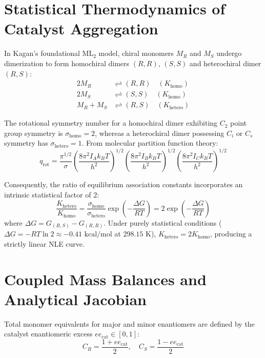 \documentclass[11pt,a4paper]{article}
\begin{document}
\section{Statistical Thermodynamics of Catalyst Aggregation}

In Kagan's foundational $\text{ML}_2$ model, chiral monomers $M_R$ and $M_S$ undergo dimerization to form homochiral dimers $(R,R)$, $(S,S)$ and heterochiral dimer $(R,S)$:
\begin{align}
2 M_R &\rightleftharpoons (R,R) \quad (K_{\text{homo}}) \\
2 M_S &\rightleftharpoons (S,S) \quad (K_{\text{homo}}) \\
M_R + M_S &\rightleftharpoons (R,S) \quad (K_{\text{hetero}})
\end{align}

The rotational symmetry number for a homochiral dimer exhibiting $C_2$ point group symmetry is $\sigma_{\text{homo}} = 2$, whereas a heterochiral dimer possessing $C_i$ or $C_s$ symmetry has $\sigma_{\text{hetero}} = 1$. From molecular partition function theory:
\begin{equation}
q_{\text{rot}} = \frac{\pi^{1/2}}{\sigma} \left( \frac{8 \pi^2 I_A k_B T}{h^2} \right)^{1/2} \left( \frac{8 \pi^2 I_B k_B T}{h^2} \right)^{1/2} \left( \frac{8 \pi^2 I_C k_B T}{h^2} \right)^{1/2}
\end{equation}

Consequently, the ratio of equilibrium association constants incorporates an intrinsic statistical factor of 2:
\begin{equation}
\frac{K_{\text{hetero}}}{K_{\text{homo}}} = \frac{\sigma_{\text{homo}}}{\sigma_{\text{hetero}}} \exp\left( -\frac{\Delta G}{RT} \right) = 2 \exp\left( -\frac{\Delta G}{RT} \right)
\end{equation}
where $\Delta G = G_{(R,S)} - G_{(R,R)}$. Under purely statistical conditions ($\Delta G = -RT \ln 2 \approx -0.41\text{ kcal/mol}$ at $298.15\text{ K}$), $K_{\text{hetero}} = 2 K_{\text{homo}}$, producing a strictly linear NLE curve.

\section{Coupled Mass Balances and Analytical Jacobian}

Total monomer equivalents for major and minor enantiomers are defined by the catalyst enantiomeric excess $ee_{\text{cat}} \in [0, 1]$:
\begin{equation}
C_R = \frac{1 + ee_{\text{cat}}}{2}, \quad C_S = \frac{1 - ee_{\text{cat}}}{2}
\end{equation}
\end{document}
